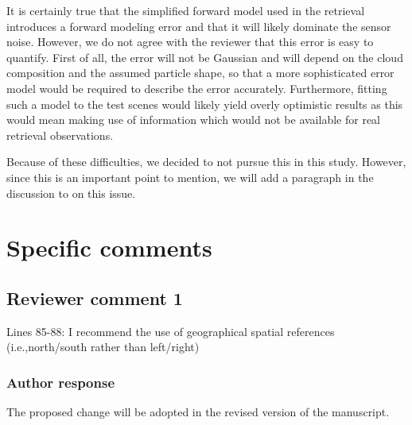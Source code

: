 \documentclass[11pt]{scrartcl}
\providecommand{\DIFadd}[1]{{\protect\textcolor{blue}{\uwave{#1}}}} %
\providecommand{\DIFdel}[1]{{\protect\textcolor{red}{\sout{#1}}}}                      %
\providecommand{\DIFaddbegin}{} %
\providecommand{\DIFaddend}{} %
\providecommand{\DIFdelbegin}{} %
\providecommand{\DIFdelend}{} %
\newenvironment{change}[1][]{%
  \begin{mdframed}[frametitle={Line #1:}]%
}{%
  \end{mdframed}%
}
\begin{document}
It is certainly true that the simplified forward model used in the retrieval
introduces a forward modeling error and that it will likely dominate the sensor
noise. However, we do not agree with the reviewer that this error is easy to
quantify. First of all, the error will not be Gaussian and will depend on the
cloud composition and the assumed particle shape, so that a more sophisticated
error model would be required to describe the error accurately. Furthermore,
fitting such a model to the test scenes would likely yield overly optimistic
results as this would mean making use of information which would not be available
for real retrieval observations.

Because of these difficulties, we decided to not pursue this in this study.
However, since this is an important point to mention, we will add a paragraph
in the discussion to on this issue.

%


\section{Specific comments}

\subsection*{Reviewer comment 1}
Lines 85-88: I recommend the use of geographical spatial references
(i.e.,north/south rather than left/right)

\subsubsection*{Author response}

The proposed change will be adopted in the revised version of the manuscript.

%
\end{document}
